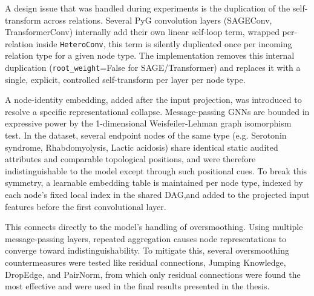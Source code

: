 A design issue that was handled during experiments is the duplication of the self-transform across relations. 
Several PyG convolution layers (SAGEConv, TransformerConv) internally add their own linear self-loop term,
 wrapped per-relation inside \texttt{HeteroConv}, this term is silently duplicated once per incoming 
relation type for a given node type. The implementation removes this internal duplication 
(\texttt{root\_weight}=False for SAGE/Transformer) and replaces it with a single, explicit, 
controlled self-transform per layer per node type. 

A node-identity embedding, added after the input projection, was introduced to resolve a specific representational 
collapse. Message-passing GNNs are bounded in expressive power by the 1-dimensional Weisfeiler-Lehman graph 
isomorphism test. In the dataset, several 
endpoint nodes of the same type (e.g. Serotonin syndrome, Rhabdomyolysis, Lactic acidosis) share 
identical static audited attributes and comparable topological 
positions, and were therefore indistinguishable to the model except through such positional cues.
To break this symmetry, a learnable embedding table is maintained per node type, 
indexed by each node's fixed local index in the shared DAG,and added 
to the projected input features before the first convolutional layer.

This connects directly to the model's handling of oversmoothing. Using multiple message-passing 
layers, repeated aggregation causes node representations to converge toward 
indistinguishability. To mitigate this, several oversmoothing countermeasures were 
tested like
residual connections, Jumping Knowledge, DropEdge, and PairNorm, from which only 
residual connections were found the most effective and were used in the final results presented
in the thesis.


